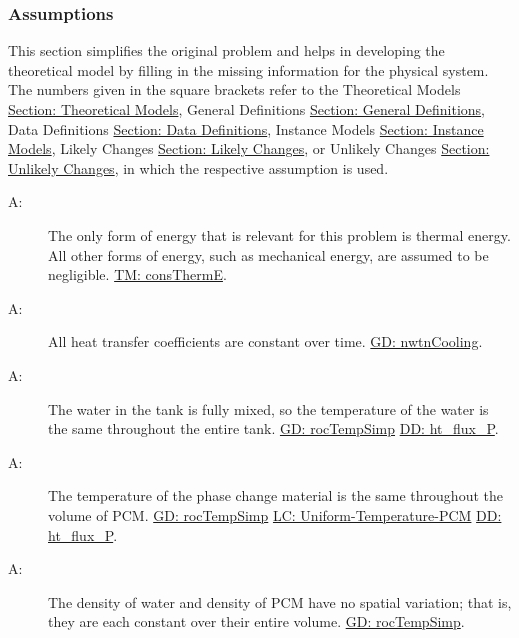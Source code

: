 \documentclass[12pt]{article}
\newcounter{assumpnum}
\newcommand{\atheassumpnum}{A\theassumpnum}
\begin{document}
\subsubsection{Assumptions}
\label{Sec:Assumps}
This section simplifies the original problem and helps in developing the theoretical model by filling in the missing information for the physical system. The numbers given in the square brackets refer to the Theoretical Models \hyperref[Sec:TMs]{Section: Theoretical Models}, General Definitions \hyperref[Sec:GDs]{Section: General Definitions}, Data Definitions \hyperref[Sec:DDs]{Section: Data Definitions}, Instance Models \hyperref[Sec:IMs]{Section: Instance Models}, Likely Changes \hyperref[Sec:LCs]{Section: Likely Changes}, or Unlikely Changes \hyperref[Sec:UCs]{Section: Unlikely Changes}, in which the respective assumption is used.
\begin{description}
\item[\atheassumpnum\label{A:Thermal-Energy-Only}:]The only form of energy that is relevant for this problem is thermal energy. All other forms of energy, such as mechanical energy, are assumed to be negligible. \hyperref[TM:consThermE]{TM: consThermE}.
\end{description}
\begin{description}
\item[\atheassumpnum\label{A:Heat-Transfer-Coeffs-Constant}:]All heat transfer coefficients are constant over time. \hyperref[GD:nwtnCooling]{GD: nwtnCooling}.
\end{description}
\begin{description}
\item[\atheassumpnum\label{A:Constant-Water-Temp-Across-Tank}:]The water in the tank is fully mixed, so the temperature of the water is the same throughout the entire tank. \hyperref[GD:rocTempSimp]{GD: rocTempSimp} \hyperref[DD:ht.flux.P]{DD: ht\_flux\_P}.
\end{description}
\begin{description}
\item[\atheassumpnum\label{A:Temp-PCM-Constant-Across-Volume}:]The temperature of the phase change material is the same throughout the volume of PCM. \hyperref[GD:rocTempSimp]{GD: rocTempSimp} \hyperref[likeChgUTP]{LC: Uniform-Temperature-PCM} \hyperref[DD:ht.flux.P]{DD: ht\_flux\_P}.
\end{description}
\begin{description}
\item[\atheassumpnum\label{A:Density-Water-PCM-Constant-over-Volume}:]The density of water and density of PCM have no spatial variation; that is, they are each constant over their entire volume. \hyperref[GD:rocTempSimp]{GD: rocTempSimp}.
\end{description}
\end{document}
